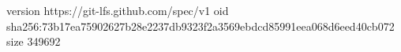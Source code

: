 version https://git-lfs.github.com/spec/v1
oid sha256:73b17ea75902627b28e2237db9323f2a3569ebdcd85991eea068d6eed40cb072
size 349692
